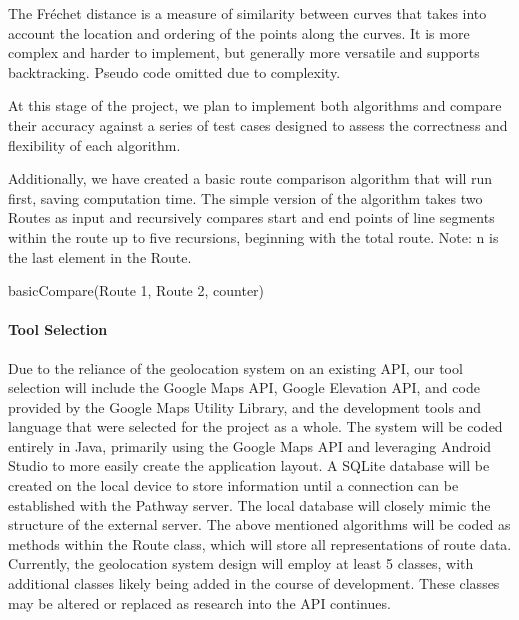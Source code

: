 \documentclass{article}
\begin{document}
The Fréchet distance is a measure of similarity between curves that takes into account the location and ordering of the points along the curves.\cite{g_frechet} It is more complex and harder to implement, but generally more versatile and supports backtracking. Pseudo code omitted due to complexity.

At this stage of the project, we plan to implement both algorithms and compare their accuracy against a series of test cases designed to assess the correctness and flexibility of each algorithm.

Additionally, we have created a basic route comparison algorithm that will run first, saving computation time. The simple version of the algorithm takes two Routes as input and recursively compares start and end points of line segments within the route up to five recursions, beginning with the total route.
\newline Note: n is the last element in the Route.\newline

\begin{algorithm}[H]
\SetAlgoLined
{}
\caption{basicCompare(Route 1, Route 2, counter)}
\end{algorithm}

\pagebreak
\paragraph{Tool Selection}
Due to the reliance of the geolocation system on an existing API, our tool selection will include the Google Maps API\cite{G_API_Maps}, Google Elevation API\cite{g_API_Elev}, and code provided by the Google Maps Utility Library\cite{g_Util_Map}, and the development tools and language that were selected for the project as a whole. The system will be coded entirely in Java, primarily using the Google Maps API and leveraging Android Studio to more easily create the application layout. A SQLite database will be created on the local device to store information until a connection can be established with the Pathway server. The local database will closely mimic the structure of the external server. The above mentioned algorithms will be coded as methods within the Route class, which will store all representations of route data. Currently, the geolocation system design will employ at least 5 classes, with additional classes likely being added in the course of development. These classes may be altered or replaced as research into the API continues.
\end{document}
